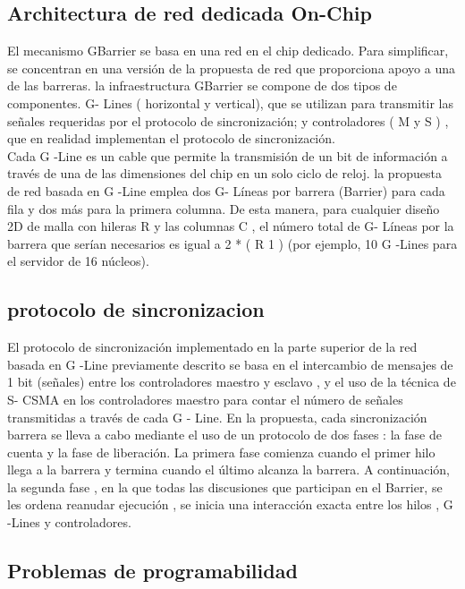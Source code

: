 \documentclass[conference]{IEEEtran}
\begin{document}
\subsection{Architectura de red dedicada On-Chip}
El mecanismo GBarrier se basa en una red en el chip dedicado. Para simplificar, se concentran en una versión de la propuesta de
red que proporciona apoyo a una de las barreras. la infraestructura GBarrier se compone de dos tipos de componentes. G- Lines ( horizontal y vertical), que se utilizan para transmitir las señales requeridas por el protocolo de sincronización; y controladores ( M y S ) , que en realidad implementan el protocolo de sincronización.\\
Cada G -Line es un cable que permite la transmisión de un bit de información a través de una de las dimensiones del chip en un solo ciclo de reloj. la propuesta de red basada en G -Line emplea dos G- Líneas por barrera (Barrier) para cada fila y dos más
para la primera columna. De esta manera, para cualquier diseño 2D de malla con hileras R y las columnas C ,
el número total de G- Líneas por la barrera que serían necesarios es igual a 2 * ( R 1 )
(por ejemplo, 10 G -Lines para el servidor de 16 núcleos).

\subsection{protocolo de sincronizacion}
El protocolo de sincronización implementado en la parte superior de la red basada en G -Line previamente
descrito se basa en el intercambio de mensajes de 1 bit (señales) entre los
controladores maestro y esclavo , y el uso de la técnica de S- CSMA en los controladores maestro
 para contar el número de señales transmitidas a través de cada G - Line. En la
propuesta, cada sincronización barrera se lleva a cabo mediante el uso de un protocolo de dos fases :
la fase de cuenta y la fase de liberación. La primera fase comienza cuando el primer hilo
llega a la barrera y termina cuando el último alcanza la barrera. A continuación, la segunda
fase , en la que todas las discusiones que participan en el Barrier, se les ordena reanudar
ejecución , se inicia una  interacción exacta entre los hilos , G -Lines y controladores.

\subsection{Problemas de programabilidad}
	 
\end{document}
